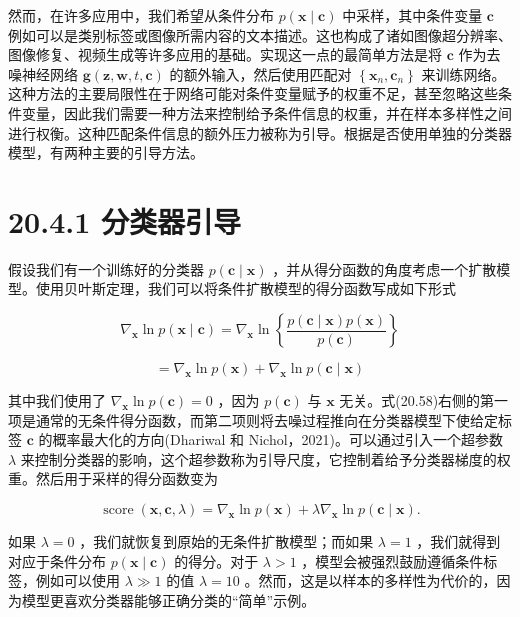 \documentclass[10pt]{article}
\begin{document}
然而，在许多应用中，我们希望从条件分布 \(p\left( {\mathbf{x} \mid  \mathbf{c}}\right)\) 中采样，其中条件变量 \(\mathbf{c}\) 例如可以是类别标签或图像所需内容的文本描述。这也构成了诸如图像超分辨率、图像修复、视频生成等许多应用的基础。实现这一点的最简单方法是将 \(\mathbf{c}\) 作为去噪神经网络 \(\mathbf{g}\left( {\mathbf{z},\mathbf{w},t,\mathbf{c}}\right)\) 的额外输入，然后使用匹配对 \(\left\{  {{\mathbf{x}}_{n},{\mathbf{c}}_{n}}\right\}\) 来训练网络。这种方法的主要局限性在于网络可能对条件变量赋予的权重不足，甚至忽略这些条件变量，因此我们需要一种方法来控制给予条件信息的权重，并在样本多样性之间进行权衡。这种匹配条件信息的额外压力被称为引导。根据是否使用单独的分类器模型，有两种主要的引导方法。

\section*{20.4.1 分类器引导}

假设我们有一个训练好的分类器 \(p\left( {\mathbf{c} \mid  \mathbf{x}}\right)\) ，并从得分函数的角度考虑一个扩散模型。使用贝叶斯定理，我们可以将条件扩散模型的得分函数写成如下形式

\[
{\nabla }_{\mathbf{x}}\ln p\left( {\mathbf{x} \mid  \mathbf{c}}\right)  = {\nabla }_{\mathbf{x}}\ln \left\{  \frac{p\left( {\mathbf{c} \mid  \mathbf{x}}\right) p\left( \mathbf{x}\right) }{p\left( \mathbf{c}\right) }\right\}
\]

\[
= {\nabla }_{\mathbf{x}}\ln p\left( \mathbf{x}\right)  + {\nabla }_{\mathbf{x}}\ln p\left( {\mathbf{c} \mid  \mathbf{x}}\right)  \tag{20.58}
\]

其中我们使用了 \({\nabla }_{\mathbf{x}}\ln p\left( \mathbf{c}\right)  = 0\) ，因为 \(p\left( \mathbf{c}\right)\) 与 \(\mathbf{x}\) 无关。式(20.58)右侧的第一项是通常的无条件得分函数，而第二项则将去噪过程推向在分类器模型下使给定标签 \(\mathbf{c}\) 的概率最大化的方向(Dhariwal 和 Nichol，2021)。可以通过引入一个超参数 \(\lambda\) 来控制分类器的影响，这个超参数称为引导尺度，它控制着给予分类器梯度的权重。然后用于采样的得分函数变为

\[
\operatorname{score}\left( {\mathbf{x},\mathbf{c},\lambda }\right)  = {\nabla }_{\mathbf{x}}\ln p\left( \mathbf{x}\right)  + \lambda {\nabla }_{\mathbf{x}}\ln p\left( {\mathbf{c} \mid  \mathbf{x}}\right) . \tag{20.59}
\]

如果 \(\lambda  = 0\) ，我们就恢复到原始的无条件扩散模型；而如果 \(\lambda  = 1\) ，我们就得到对应于条件分布 \(p\left( {\mathbf{x} \mid  \mathbf{c}}\right)\) 的得分。对于 \(\lambda  > 1\) ，模型会被强烈鼓励遵循条件标签，例如可以使用 \(\lambda  \gg  1\) 的值 \(\lambda  = {10}\) 。然而，这是以样本的多样性为代价的，因为模型更喜欢分类器能够正确分类的“简单”示例。
\end{document}
